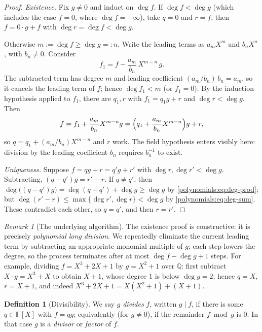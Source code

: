 \documentclass[11pt,a4paper]{article}
\theoremstyle{definition}
\newtheorem{definition}[theorem]{Definition}
\theoremstyle{remark}
\newtheorem{remark}[theorem]{Remark}
\newcommand{\Q}{\ensuremath{\mathbb{Q}}}
\newcommand{\F}{\ensuremath{\mathbb{F}}}
\begin{document}
\begin{proof}
\emph{Existence.} Fix \(g \neq 0\) and induct on \(\deg f\). If
\(\deg f < \deg g\) (which includes the case \(f = 0\), where
\(\deg f = -\infty\)), take \(q = 0\) and \(r = f\); then \(f = 0 \cdot g + f\)
with \(\deg r = \deg f < \deg g\).

Otherwise \(m := \deg f \ge \deg g =: n\). Write the leading terms as
\(a_m X^m\) and \(b_n X^n\), with \(b_n \neq 0\). Consider
\[
  f_1 = f - \frac{a_m}{b_n}\, X^{m-n}\, g.
\]
The subtracted term has degree \(m\) and leading coefficient
\((a_m / b_n)\, b_n = a_m\), so it cancels the leading term of \(f\); hence
\(\deg f_1 < m\) (or \(f_1 = 0\)). By the induction hypothesis applied to
\(f_1\), there are \(q_1, r\) with \(f_1 = q_1 g + r\) and \(\deg r < \deg g\).
Then
\[
  f = f_1 + \frac{a_m}{b_n} X^{m-n} g
    = \Bigl(q_1 + \frac{a_m}{b_n} X^{m-n}\Bigr) g + r,
\]
so \(q = q_1 + (a_m/b_n) X^{m-n}\) and \(r\) work. The field hypothesis enters
visibly here: division by the leading coefficient \(b_n\) requires \(b_n^{-1}\)
to exist.

\emph{Uniqueness.} Suppose \(f = q g + r = q' g + r'\) with
\(\deg r, \deg r' < \deg g\). Subtracting, \((q - q') g = r' - r\). If
\(q \neq q'\), then \(\deg\bigl((q-q')g\bigr) = \deg(q - q') + \deg g \ge
\deg g\) by \eqref{polynomials:eq:deg-prod}; but
\(\deg(r' - r) \le \max\{\deg r', \deg r\} < \deg g\) by
\eqref{polynomials:eq:deg-sum}. These contradict each other, so \(q = q'\), and
then \(r = r'\).
\end{proof}

\begin{remark}[The underlying algorithm]\label{polynomials:rem:long-division}
The existence proof is constructive: it is precisely \emph{polynomial long
division}. We repeatedly eliminate the current leading term by subtracting an
appropriate monomial multiple of \(g\); each step lowers the degree, so the
process terminates after at most \(\deg f - \deg g + 1\) steps. For example,
dividing \(f = X^3 + 2X + 1\) by \(g = X^2 + 1\) over \(\Q\): first subtract
\(X \cdot g = X^3 + X\) to obtain \(X + 1\), whose degree \(1\) is below
\(\deg g = 2\); hence \(q = X\), \(r = X + 1\), and indeed
\(X^3 + 2X + 1 = X(X^2 + 1) + (X + 1)\).
\end{remark}

\begin{definition}[Divisibility]\label{polynomials:def:divisibility}
We say \(g\) \emph{divides} \(f\), written \(g \mid f\), if there is some
\(q \in \F[X]\) with \(f = q g\); equivalently (for \(g \neq 0\)), if the
remainder \(f \bmod g\) is \(0\). In that case \(g\) is a \emph{divisor} or
\emph{factor} of \(f\).
\end{definition}
\end{document}
